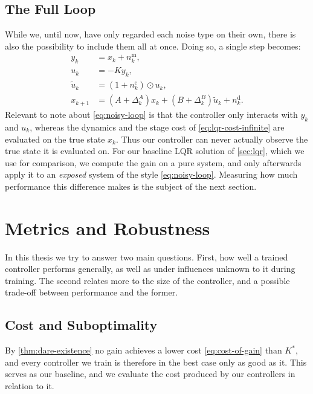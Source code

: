 \subsection{The Full Loop}
\label{subsec:full-noise}
While we, until now, have only regarded each noise type on their own,
there is also the possibility to include them all at once. Doing so,
a single step becomes:
\begin{subequations}
\label{eq:noisy-loop}
\begin{align}
    y_k     &= x_k + n^{\mathrm{m}}_k , \label{eq:noisy-obs}\\
    u_k     &= -K y_k , \label{eq:noisy-ctrl}\\
    \tilde{u}_k     &= \left( 1 + n^{\mathrm{c}}_k \right) \odot u_k , \label{eq:noisy-act}\\
    x_{k+1} &= \left( A + \Delta_k^{A} \right) x_k + \left( B + \Delta_k^{B} \right) \tilde{u}_k + n^{\mathrm{d}}_k . \label{eq:noisy-dyn}
\end{align}
\end{subequations}
Relevant to note about \eqref{eq:noisy-loop} is that the controller only 
interacts with $y_k$ and $u_k$, whereas the dynamics
and the stage cost of \eqref{eq:lqr-cost-infinite} are evaluated on the true
state $x_k$. Thus our controller can never actually observe the true state it is
evaluated on. For our baseline LQR solution of \cref{sec:lqr}, which we use for comparison,
we compute the gain on a pure system, and only afterwards apply it to an
\emph{exposed} system of the style \eqref{eq:noisy-loop}. Measuring how much
performance this difference makes is the subject of the next section.
 
\section{Metrics and Robustness}
\label{sec:robustness}

In this thesis we try to answer two main questions. First, how well a 
trained controller performs generally, as well as under influences
unknown to it during training. The second relates more to the size
of the controller, and a possible trade-off between performance and
the former.

\subsection{Cost and Suboptimality}
\label{subsec:suboptimality}

By \cref{thm:dare-existence} no gain achieves a
lower cost \eqref{eq:cost-of-gain} than $K^{*}$, and every controller we
train is therefore in the best case only as good as it. This serves as our
baseline, and we evaluate the cost produced by our controllers in relation to
it.

